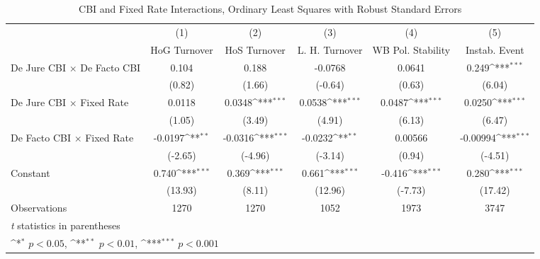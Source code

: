 \begin{table}[htbp]\centering
\def\sym#1{\ifmmode^{#1}\else\(^{#1}\)\fi}
\caption{CBI and Fixed Rate Interactions, Ordinary Least Squares with Robust Standard Errors \label{imultIndOLS}}
\begin{tabular}{l*{5}{c}}
\toprule
                                        &\multicolumn{1}{c}{(1)}&\multicolumn{1}{c}{(2)}&\multicolumn{1}{c}{(3)}&\multicolumn{1}{c}{(4)}&\multicolumn{1}{c}{(5)}\\
                                        &\multicolumn{1}{c}{HoG Turnover}&\multicolumn{1}{c}{HoS Turnover}&\multicolumn{1}{c}{L. H. Turnover}&\multicolumn{1}{c}{WB Pol. Stability}&\multicolumn{1}{c}{Instab. Event}\\
\midrule
De Jure CBI $\times$ De Facto CBI       &    0.104         &    0.188         &  -0.0768         &   0.0641         &    0.249\sym{***}\\
                                        &   (0.82)         &   (1.66)         &  (-0.64)         &   (0.63)         &   (6.04)         \\
\addlinespace
De Jure CBI $\times$ Fixed Rate         &   0.0118         &   0.0348\sym{***}&   0.0538\sym{***}&   0.0487\sym{***}&   0.0250\sym{***}\\
                                        &   (1.05)         &   (3.49)         &   (4.91)         &   (6.13)         &   (6.47)         \\
\addlinespace
De Facto CBI $\times$ Fixed Rate        &  -0.0197\sym{**} &  -0.0316\sym{***}&  -0.0232\sym{**} &  0.00566         & -0.00994\sym{***}\\
                                        &  (-2.65)         &  (-4.96)         &  (-3.14)         &   (0.94)         &  (-4.51)         \\
\addlinespace
Constant                                &    0.740\sym{***}&    0.369\sym{***}&    0.661\sym{***}&   -0.416\sym{***}&    0.280\sym{***}\\
                                        &  (13.93)         &   (8.11)         &  (12.96)         &  (-7.73)         &  (17.42)         \\
\midrule
Observations                            &     1270         &     1270         &     1052         &     1973         &     3747         \\
\bottomrule
\multicolumn{6}{l}{\footnotesize \textit{t} statistics in parentheses}\\
\multicolumn{6}{l}{\footnotesize \sym{*} \(p<0.05\), \sym{**} \(p<0.01\), \sym{***} \(p<0.001\)}\\
\end{tabular}
\end{table}
